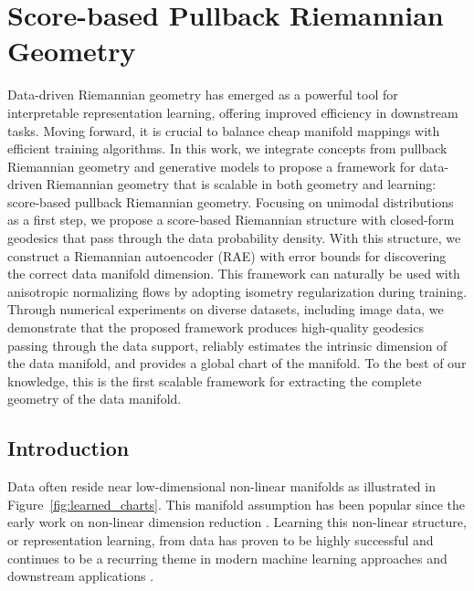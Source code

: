
\chapter{Score-based Pullback Riemannian Geometry}\label{Chapter:Pullback-riemannian-geometry}

\ifpdf
    \graphicspath{{Chapter5/Figs/Raster/}{Chapter5/Figs/PDF/}{Chapter5/Figs/}}
\else
    \graphicspath{{Chapter5/Figs/Vector/}{Chapter5/Figs/}}
\fi

Data-driven Riemannian geometry has emerged as a powerful tool for interpretable representation learning, offering improved efficiency in downstream tasks. Moving forward, it is crucial to balance cheap manifold mappings with efficient training algorithms. In this work, we integrate concepts from pullback Riemannian geometry and generative models to propose a framework for data-driven Riemannian geometry that is scalable in both geometry and learning: score-based pullback Riemannian geometry. Focusing on unimodal distributions as a first step, we propose a score-based Riemannian structure with closed-form geodesics that pass through the data probability density. With this structure, we construct a Riemannian autoencoder (RAE) with error bounds for discovering the correct data manifold dimension. This framework can naturally be used with anisotropic normalizing flows by adopting isometry regularization during training. Through numerical experiments on diverse datasets, including image data, we demonstrate that the proposed framework produces high-quality geodesics passing through the data support, reliably estimates the intrinsic dimension of the data manifold, and provides a global chart of the manifold. To the best of our knowledge, this is the first scalable framework for extracting the complete geometry of the data manifold.

\section{Introduction}

Data often reside near low-dimensional non-linear manifolds as illustrated in Figure~\ref{fig:learned_charts}. This manifold assumption \cite{fefferman2016testing} has been popular since the early work on non-linear dimension reduction \cite{belkin2001laplacian,coifman2006diffusion,roweis2000nonlinear,sammon1969nonlinear,tenenbaum2000global}. Learning this non-linear structure, or representation learning, from data has proven to be highly successful \cite{demers1992non,kingma2013auto} and continues to be a recurring theme in modern machine learning approaches and downstream applications \cite{chow2022predicting,gomari2022variational,ternes2022multi,vahdat2020nvae,zhong2021cryodrgn}. 


